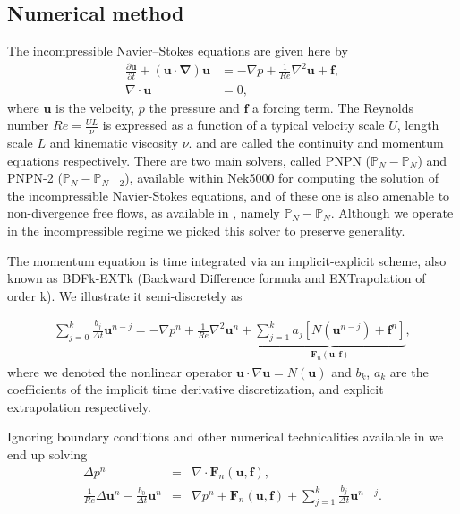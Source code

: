 \documentclass{sig-alternate}
\begin{document}
\subsection{Numerical method}
\label{sec:method}
The incompressible Navier--Stokes equations are given here by
\begin{align} 
 \frac{\partial \mathbf{u}}{\partial t} + (\mathbf{u \cdot \nabla}) \mathbf{u} & = - \nabla p + \frac{1}{Re} \nabla^2 \mathbf{u} + \mathbf{f} \label{eqn:NS_momentum},\\
 \nabla \cdot \mathbf{u} & = 0, \label{eqn:NS_continuity}
\end{align}
where $\mathbf{u}$ is the velocity, $p$ the pressure and $\mathbf{f}$ a forcing 
term. The Reynolds number 
$Re = \frac{U L}{\nu}$ is expressed as a function of a typical velocity scale $U$,
length scale $L$ and kinematic viscosity $\nu$.  
and  are called the continuity and momentum equations 
respectively. There are two main solvers, called PNPN ($\mathbb{P}_N-\mathbb{P}_N$) and PNPN-2 
($\mathbb{P}_N-\mathbb{P}_{N-2}$), available within 
Nek5000 for computing the solution of the incompressible 
Navier-Stokes equations, and of these one is also amenable to non-divergence free 
flows, as available in \cite{Tomboulides1997}, namely $\mathbb{P}_N-\mathbb{P}_N$. Although we operate in the incompressible
regime we picked this solver to preserve generality. 

The momentum equation is time integrated via an implicit-explicit scheme, also
known as BDFk-EXTk (Backward Difference formula and EXTrapolation of order k). We
illustrate it semi-discretely as

\begin{eqnarray}
\sum\limits_{j=0}^k \frac{b_j}{\Delta t} \mathbf u^{n-j}  = - \nabla p^{n}+\frac{1}{Re}\nabla^2\mathbf u^{n}+\underbrace{\sum\limits_{j=1}^k a_j [N(\mathbf u^{n-j})+\mathbf f^{n}]}_{\mathbf{F}_n(\mathbf u,\mathbf f)},\label{eqn:discrete}
\end{eqnarray}
where we denoted the nonlinear operator $\mathbf u \cdot \nabla \mathbf u=N(\mathbf u)$ and $b_k$, $a_k$ are the coefficients of the implicit time derivative discretization, and explicit extrapolation respectively.

Ignoring boundary conditions and other numerical technicalities available in \cite{Tomboulides1997} we end up solving
\begin{eqnarray}
 \Delta p^{n} &= &\nabla \cdot  \mathbf{F}_n \left( \mathbf{u},\mathbf f \right), \label{eqn:hmhz_pres}\\
 \frac{1}{Re}\Delta \mathbf{u}^{n}- \frac{b_0}{\Delta t} \mathbf{u}^{n} & = & \nabla p^{n} + \mathbf{F}_n ( \mathbf{u}, \mathbf f)  +\sum\limits_{j=1}^k \frac{b_j}{\Delta t} \mathbf u^{n-j} . \label{eqn:hmhz_vel}
\end{eqnarray}
\end{document}

